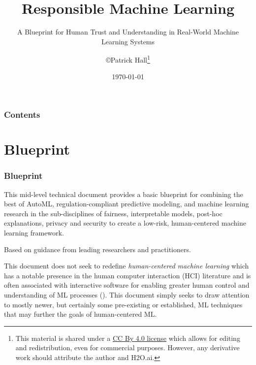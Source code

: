 \documentclass[11pt,
               aspectratio=169,
               hyperref={colorlinks}
               ]{beamer}
\author{\copyright\hspace{1pt}Patrick Hall\footnote{\tiny{This material is shared under a \href{https://creativecommons.org/licenses/by/4.0/deed.ast}{CC By 4.0 license} which allows for editing and redistribution, even for commercial purposes. However, any derivative work should attribute the author and H2O.ai.}}}
\title{Responsible Machine Learning}
\subtitle{\scriptsize{A Blueprint for Human Trust and Understanding in Real-World Machine Learning Systems}}
\institute{\href{https://www.h2o.ai}{H\textsubscript{2}O.ai}}
\date{\today}
\begin{document}
	
	\maketitle
	
	\begin{frame}
	
		\frametitle{Contents}
		
		\tableofcontents{}
		
	\end{frame}

	\section{Blueprint}
	
		\begin{frame}
		
			\frametitle{Blueprint}			
			
			This mid-level technical document provides a basic blueprint for combining the best of AutoML, regulation-compliant predictive modeling, and machine learning research in the sub-disciplines of fairness, interpretable models, post-hoc explanations, privacy and security to create a low-risk, human-centered machine learning framework.\\
			
			\vspace{10pt}			
			
			Based on guidance from leading researchers and practitioners.
			
			\vspace{10pt}
			
			This document does not seek to redefine \textit{human-centered machine learning} which has a notable presence in the human computer interaction (HCI) literature and is often associated with interactive software for enabling greater human control and understanding of ML processes (\cite{hcml}). This document simply seeks to draw attention to mostly newer, but certainly some pre-existing or established, ML techniques that may further the goals of human-centered ML. 
			
					
		\end{frame}					
		
\end{document}
